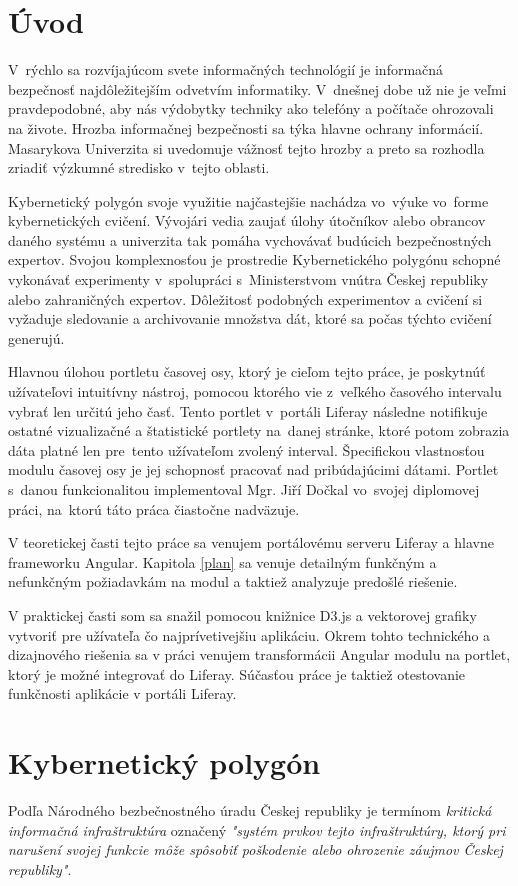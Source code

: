 \documentclass[
  digital, %
  twoside, %
  notable,   %
  nolof,   %
  nolot,   %
]{fithesis3}
\begin{document}
\chapter*{Úvod}
V~rýchlo sa rozvíjajúcom svete informačných technológií je informačná bezpečnosť najdôležitejším odvetvím informatiky. V~dnešnej dobe už nie je veľmi pravdepodobné, aby nás výdobytky techniky ako telefóny a počítače ohrozovali na živote. Hrozba informačnej bezpečnosti sa týka hlavne ochrany informácií. Masarykova Univerzita si uvedomuje vážnosť tejto hrozby a preto sa rozhodla zriadiť výzkumné stredisko v~tejto oblasti.

Kybernetický polygón svoje využitie najčastejšie nachádza vo~výuke vo~forme kybernetických cvičení. Vývojári vedia zaujať úlohy útočníkov alebo obrancov daného systému a univerzita tak pomáha vychovávať budúcich bezpečnostných expertov. Svojou komplexnosťou je prostredie Kybernetického polygónu schopné vykonávať experimenty v~spolupráci s~Ministerstvom vnútra Českej republiky alebo zahraničných expertov. Dôležitosť podobných experimentov a cvičení si vyžaduje sledovanie a archivovanie množstva dát, ktoré sa počas týchto cvičení generujú.

Hlavnou úlohou portletu časovej osy, ktorý je cieľom tejto práce, je poskytnúť užívateľovi intuitívny nástroj, pomocou ktorého vie z~veľkého časového intervalu vybrať len určitú jeho časť. Tento portlet v~portáli Liferay následne notifikuje ostatné vizualizačné a štatistické portlety na~danej stránke, ktoré potom zobrazia dáta platné len pre~tento užívateľom zvolený interval. Špecifickou vlastnosťou modulu časovej osy je jej schopnosť pracovať nad pribúdajúcimi dátami. Portlet s~danou funkcionalitou implementoval Mgr. Jiří Dočkal vo~svojej diplomovej práci, na~ktorú táto práca čiastočne nadväzuje.

V teoretickej časti tejto práce sa venujem portálovému serveru Liferay a hlavne frameworku Angular. Kapitola \ref{plan} sa venuje detailným funkčným a nefunkčným požiadavkám na modul a taktiež analyzuje predošlé riešenie.

V praktickej časti som sa snažil pomocou knižnice D3.js a vektorovej grafiky vytvoriť pre užívateľa čo najprívetivejšiu aplikáciu. Okrem tohto technického a dizajnového riešenia sa v práci venujem transformácii Angular modulu na portlet, ktorý je možné integrovať do Liferay. Súčasťou práce je taktiež otestovanie funkčnosti aplikácie v portáli Liferay.

\chapter{Kybernetický polygón}
Podľa Národného bezbečnostného úradu Českej republiky je termínom \textit{kritická informačná infraštruktúra} označený \textit{"systém prvkov tejto infraštruktúry, ktorý pri narušení svojej funkcie môže spôsobiť poškodenie alebo ohrozenie záujmov Českej republiky"}\cite{nbu2012}.
\end{document}
